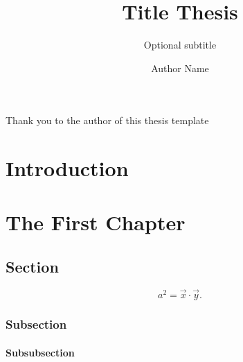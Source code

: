 \documentclass{thesis}
\title{Title Thesis}
\subtitle{Optional subtitle}
\author{Author Name}
\begin{document}
\frontmatter

\maketitle \cleardoublepage

\begin{abstract}
    \lipsum[1]
\end{abstract}

\begin{dedication}
    Thank you to the author of this thesis template
\end{dedication}

\begin{acknowledgements}
    \lipsum[2]
\end{acknowledgements}

\tableofcontents
\listoffigures
\listoftables

\chapter{Introduction}
\lipsum[3-8]


\mainmatter

\chapter{The First Chapter} \label{chap:first_chapter}
\lipsum[9-11]
\section{Section}
\lipsum[12]

\begin{equation} \label{eq:an_equation}
    a^2 = \vec{x} \cdot \vec{y} .
\end{equation}

\lipsum[13]
\subsection{Subsection}
\lipsum[14]
\subsubsection{Subsubsection}
\lipsum[15]
\end{document}
